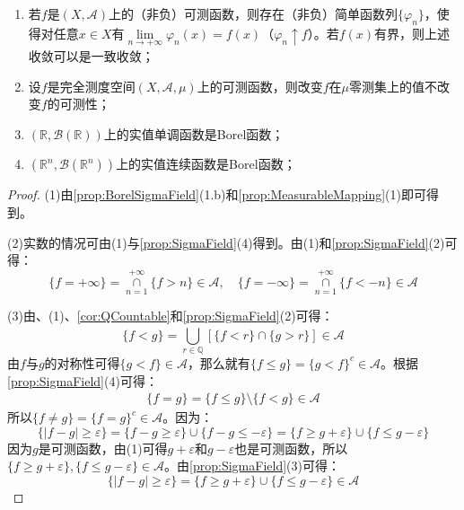 \begin{property}
\begin{enumerate}
		\item 若$f$是$(X,\mathscr{A})$上的（非负）可测函数，则存在（非负）简单函数列$\{\varphi_n\}$，使得对任意$x\in X$有$\lim\limits_{n\to+\infty}\varphi_n(x)=f(x)$（$\varphi_n\uparrow f$）。若$f(x)$有界，则上述收敛可以是一致收敛；
		\item 设$f$是完全测度空间$(X,\mathscr{A},\mu)$上的可测函数，则改变$f$在$\mu$零测集上的值不改变$f$的可测性；
		\item $(\mathbb{R},\mathcal{B}(\mathbb{R}))$上的实值单调函数是Borel函数；
		\item $(\mathbb{R}^n,\mathcal{B}(\mathbb{R}^{n}))$上的实值连续函数是Borel函数；
	\end{enumerate}
\end{property}
\begin{proof}
	(1)由\cref{prop:BorelSigmaField}(1.b)和\cref{prop:MeasurableMapping}(1)即可得到。\par
	(2)实数的情况可由(1)与\cref{prop:SigmaField}(4)得到。由(1)和\cref{prop:SigmaField}(2)可得：
	\begin{equation*}
		\{f=+\infty\}=\underset{n=1}{\overset{+\infty}{\cap}}\{f>n\}\in\mathscr{A},\quad\{f=-\infty\}=\underset{n=1}{\overset{+\infty}{\cap}}\{f<-n\}\in\mathscr{A}
	\end{equation*}\par
	(3)由、(1)、\cref{cor:QCountable}和\cref{prop:SigmaField}(2)可得：
	\begin{equation*}
		\{f<g\}=\underset{r\in\mathbb{Q}}{\overset{}{\bigcup}}[\{f<r\}\cap\{g>r\}]\in\mathscr{A}
	\end{equation*}
	由$f$与$g$的对称性可得$\{g<f\}\in\mathscr{A}$，那么就有$\{f\leqslant g\}=\{g<f\}^c\in\mathscr{A}$。根据\cref{prop:SigmaField}(4)可得：
	\begin{align*}
		\{f=g\}=\{f\leqslant g\}\setminus\{f<g\}\in\mathscr{A}
	\end{align*}
	所以$\{f\ne g\}=\{f=g\}^c\in\mathscr{A}$。因为：
	\begin{equation*}
		\{|f-g|\geqslant\varepsilon\}=\{f-g\geqslant\varepsilon\}\cup\{f-g\leqslant-\varepsilon\}=\{f\geqslant g+\varepsilon\}\cup\{f\leqslant g-\varepsilon\}
	\end{equation*}
	因为$g$是可测函数，由(1)可得$g+\varepsilon$和$g-\varepsilon$也是可测函数，所以$\{f\geqslant g+\varepsilon\},\{f\leqslant g-\varepsilon\}\in\mathscr{A}$。由\cref{prop:SigmaField}(3)可得：
	\begin{equation*}
		\{|f-g|\geqslant\varepsilon\}=\{f\geqslant g+\varepsilon\}\cup\{f\leqslant g-\varepsilon\}\in\mathscr{A}

\end{equation*}
\end{proof}
